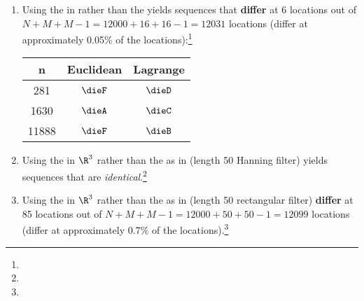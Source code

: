 \begin{example}
\begin{enumerate}
\begin{enumerate}
      \item Using the  in  rather than the  
            yields sequences that \textbf{differ} at 6 locations out of $N+M+M-1=12000+16+16-1=12031$ locations
            (differ at approximately 0.05\% of the locations):\footnote{}
            \\\indentx\begin{tabstr}{0.75}\begin{tabular}{|c|c|c|}
                         \hline%
                           n   & Euclidean & Lagrange
                         \\\hline
                             281 & $\dieF$ & $\dieD$ 
                         \\ 1630 & $\dieA$ & $\dieC$ 
                         \\11888 & $\dieF$ & $\dieB$ 
                         \\\hline
                       \end{tabular}\end{tabstr}

      \item Using the  in $\R^3$ rather than the  as in 
             (length 50 Hanning filter)
            yields sequences that are \emph{identical}.\footnote{} %

      \item Using the  in $\R^3$ rather than the  as 
            in  (length 50 rectangular filter)
            \textbf{differ} at 85 locations out of $N+M+M-1=12000+50+50-1=12099$ locations
            (differ at approximately 0.7\% of the locations).\footnote{} %
    \end{enumerate}

\end{enumerate}
\end{example}


